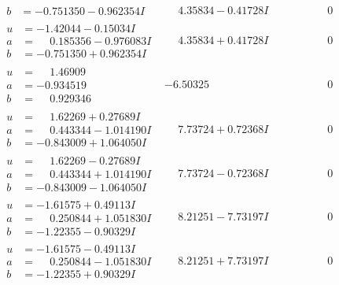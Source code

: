 \documentclass[1p]{elsarticle_modified}
\theoremstyle{definition}
\begin{document}
$$\begin{array}{c|c|c}
\begin{aligned}
b &= -0.751350 - 0.962354 I\end{aligned}
 & \phantom{-}4.35834 - 0.41728 I & \phantom{-0.000000 } 0 \\ \hline\begin{aligned}
u &= -1.42044 - 0.15034 I \\
a &= \phantom{-}0.185356 - 0.976083 I \\
b &= -0.751350 + 0.962354 I\end{aligned}
 & \phantom{-}4.35834 + 0.41728 I & \phantom{-0.000000 } 0 \\ \hline\begin{aligned}
u &= \phantom{-}1.46909\phantom{ +0.000000I} \\
a &= -0.934519\phantom{ +0.000000I} \\
b &= \phantom{-}0.929346\phantom{ +0.000000I}\end{aligned}
 & -6.50325\phantom{ +0.000000I} & \phantom{-0.000000 } 0 \\ \hline\begin{aligned}
u &= \phantom{-}1.62269 + 0.27689 I \\
a &= \phantom{-}0.443344 - 1.014190 I \\
b &= -0.843009 + 1.064050 I\end{aligned}
 & \phantom{-}7.73724 + 0.72368 I & \phantom{-0.000000 } 0 \\ \hline\begin{aligned}
u &= \phantom{-}1.62269 - 0.27689 I \\
a &= \phantom{-}0.443344 + 1.014190 I \\
b &= -0.843009 - 1.064050 I\end{aligned}
 & \phantom{-}7.73724 - 0.72368 I & \phantom{-0.000000 } 0 \\ \hline\begin{aligned}
u &= -1.61575 + 0.49113 I \\
a &= \phantom{-}0.250844 + 1.051830 I \\
b &= -1.22355 - 0.90329 I\end{aligned}
 & \phantom{-}8.21251 - 7.73197 I & \phantom{-0.000000 } 0 \\ \hline\begin{aligned}
u &= -1.61575 - 0.49113 I \\
a &= \phantom{-}0.250844 - 1.051830 I \\
b &= -1.22355 + 0.90329 I\end{aligned}
 & \phantom{-}8.21251 + 7.73197 I & \phantom{-0.000000 } 0 \\ \hline\begin{aligned}

\end{aligned}
\end{array}$$
\end{document}
